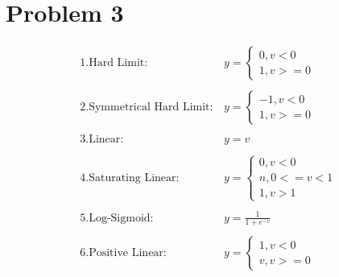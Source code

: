 \documentclass[12pt]{article}
\begin{document}
\section*{Problem 3}
\begin{align*}
    1.\text{Hard Limit}: &y = \begin{cases}
                            0,  v<0 \\
                            1,  v>= 0
                        \end{cases}\\\\
    2.\text{Symmetrical Hard Limit}: &y = \begin{cases}
                            -1,  v<0 \\
                            1,  v>= 0
                        \end{cases}\\\\ 
    3.\text{Linear}: &y = v\\\\
    4.\text{Saturating Linear}: &y = \begin{cases}
                            0,  v<0 \\
                            n,  0<=v<1\\
                            1,  v>1
                        \end{cases}\\\\
    5.\text{Log-Sigmoid: }&y =\frac{1}{1+e^{-v}} \\\\
    6.\text{Positive Linear}: &y = \begin{cases}
                            1,  v<0 \\
                            v,  v>= 0
                        \end{cases}\\\\
\end{align*}
\end{document}
